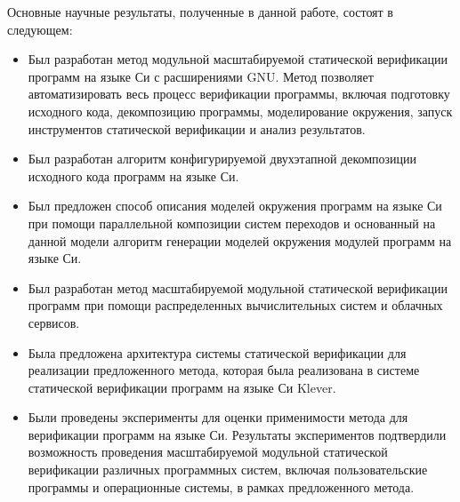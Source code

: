 \documentclass[%
candidate,     %
href,        %
colorlinks,  %
]{disser}
\begin{document}
Основные научные результаты, полученные в данной работе, состоят в следующем:
\begin{itemize}
    \item Был разработан метод модульной масштабируемой статической верификации программ на языке Си с расширениями GNU.
    Метод позволяет автоматизировать весь процесс верификации программы, включая подготовку исходного кода, декомпозицию программы, моделирование окружения, запуск инструментов статической верификации и анализ результатов.
    \item Был разработан алгоритм конфигурируемой двухэтапной декомпозиции исходного кода программ на языке Си. 
    \item Был предложен способ описания моделей окружения программ на языке Си при помощи параллельной композиции систем переходов и основанный на данной модели алгоритм генерации моделей окружения модулей программ на языке Си.
    \item Был разработан метод масштабируемой модульной статической верификации программ при помощи распределенных вычислительных систем и облачных сервисов.
    \item Была предложена архитектура системы статической верификации для реализации предложенного метода, которая была реализована в системе статической верификации программ на языке Си Klever.
    \item Были проведены эксперименты для оценки применимости метода для верификации программ на языке Си. Результаты экспериментов подтвердили возможность проведения масштабируемой модульной статической верификации различных программных систем, включая пользовательские программы и операционные системы, в рамках предложенного метода.
    
\end{itemize}

\printbibliography[heading=authorcited,keyword={mypaper}, resetnumbers=true]
\printbibliography[heading=cited, notkeyword={mypaper}]

\end{document}
